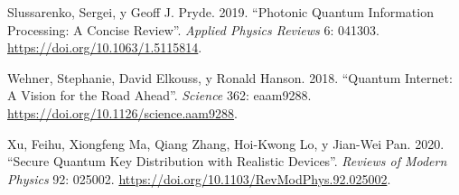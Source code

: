 \documentclass[
  11pt,
  letterpaper,
]{article}
\newlength{\cslhangindent}
\newenvironment{CSLReferences}[2] %
 {\begin{list}{}{%
  \setlength{\itemindent}{0pt}
  \setlength{\leftmargin}{0pt}
  \setlength{\parsep}{0pt}
  \ifodd #1
   \setlength{\leftmargin}{\cslhangindent}
   \setlength{\itemindent}{-1\cslhangindent}
  \fi
  \setlength{\itemsep}{#2\baselineskip}}}
 {\end{list}}
\begin{document}
\begin{CSLReferences}{1}{0}
Slussarenko, Sergei, y Geoff J. Pryde. 2019. {``Photonic Quantum
Information Processing: A Concise Review''}. \emph{Applied Physics
Reviews} 6: 041303. \url{https://doi.org/10.1063/1.5115814}.

Wehner, Stephanie, David Elkouss, y Ronald Hanson. 2018. {``Quantum
Internet: A Vision for the Road Ahead''}. \emph{Science} 362: eaam9288.
\url{https://doi.org/10.1126/science.aam9288}.

Xu, Feihu, Xiongfeng Ma, Qiang Zhang, Hoi-Kwong Lo, y Jian-Wei Pan.
2020. {``Secure Quantum Key Distribution with Realistic Devices''}.
\emph{Reviews of Modern Physics} 92: 025002.
\url{https://doi.org/10.1103/RevModPhys.92.025002}.

\end{CSLReferences}
\end{document}
